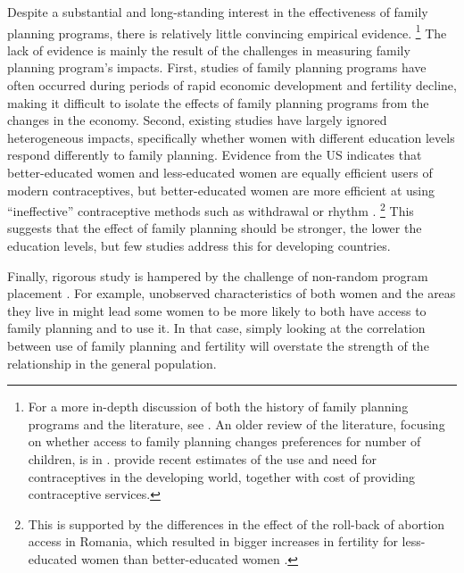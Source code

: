 \documentclass[letterpaper,12pt]{article}
\begin{document}
Despite a substantial and long-standing interest in the effectiveness of
family planning programs, there is relatively little convincing
empirical evidence.%
\footnote{
For a more in-depth discussion of both the history of family planning
programs and the literature, see \citet{Miller2016}. 
An older review of the literature, focusing on whether access to family
planning changes preferences for number of children, is in
\citet{Freedman1997}. 
\citet{Singh2012} provide recent estimates of the use and need for
contraceptives in the developing world, together with cost of providing
contraceptive services.} 
The lack of evidence is mainly the result of the challenges in measuring
family planning program's impacts. 
First, studies of family planning programs have often occurred during
periods of rapid economic development and fertility decline, making it
difficult to isolate the effects of family planning programs from the
changes in the economy. 
Second, existing studies have largely ignored heterogeneous impacts,
specifically whether women with different education levels respond
differently to family planning. 
Evidence from the US indicates that better-educated women and
less-educated women are equally efficient users of modern
contraceptives, but better-educated women are more efficient at using
``ineffective'' contraceptive methods such as withdrawal or rhythm
\citep{Rosenzweig1989}.%
\footnote{
This is supported by the differences in the effect of the roll-back of
abortion access in Romania, which resulted in bigger increases in
fertility for less-educated women than better-educated women
\citep{Pop-Eleches2010}.} 
This suggests that the effect of family planning should be stronger, the
lower the education levels, but few studies address this for developing
countries.

Finally, rigorous study is hampered by the challenge of non-random
program placement \citep{rosenzweig86,pitt93,Miller2016}. 
For example, unobserved characteristics of both women and the areas they
live in might lead some women to be more likely to both have access to
family planning and to use it. 
In that case, simply looking at the correlation between use of family
planning and fertility will overstate the strength of the relationship
in the general population.
\end{document}
